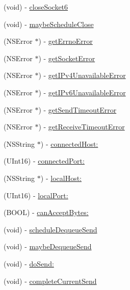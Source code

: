 \begin{DoxyCompactItemize}
(void) -\/ \hyperlink{interface_async_udp_socket_af7dc2926f72fefd01ea33f134adb5fbc}{closeSocket6}
\item 
(void) -\/ \hyperlink{interface_async_udp_socket_a7aa6a27140fde291dfdbc7c384029a8d}{maybeScheduleClose}
\item 
(NSError $\ast$) -\/ \hyperlink{interface_async_udp_socket_a804640cdef7c41b9d00db44feb235149}{getErrnoError}
\item 
(NSError $\ast$) -\/ \hyperlink{interface_async_udp_socket_a9b0a42080e950dde8de512e46e067443}{getSocketError}
\item 
(NSError $\ast$) -\/ \hyperlink{interface_async_udp_socket_a400285c677c62b8a3f30b1185c282514}{getIPv4UnavailableError}
\item 
(NSError $\ast$) -\/ \hyperlink{interface_async_udp_socket_aef7f9ecd9ed1b24c11ec14022d5bf6d6}{getIPv6UnavailableError}
\item 
(NSError $\ast$) -\/ \hyperlink{interface_async_udp_socket_aaef4f2fe9971a5f6a3c4114ada0ca1dd}{getSendTimeoutError}
\item 
(NSError $\ast$) -\/ \hyperlink{interface_async_udp_socket_acb99a994a572be47e40859d6910baee7}{getReceiveTimeoutError}
\item 
(NSString $\ast$) -\/ \hyperlink{interface_async_udp_socket_a7a10cb2cb03eb0e06aea6bcb16f84a8b}{connectedHost:}
\item 
(UInt16) -\/ \hyperlink{interface_async_udp_socket_a5910314780c573d73d483b466020a1ed}{connectedPort:}
\item 
(NSString $\ast$) -\/ \hyperlink{interface_async_udp_socket_a59fe5c5c33e9e7dfa11ffc2bc4e18c38}{localHost:}
\item 
(UInt16) -\/ \hyperlink{interface_async_udp_socket_a384db6eb52b78874c030bcd063046e76}{localPort:}
\item 
(BOOL) -\/ \hyperlink{interface_async_udp_socket_a7bd266b270810085c2cd79205b699fd1}{canAcceptBytes:}
\item 
(void) -\/ \hyperlink{interface_async_udp_socket_ad81347d85c536bf72d1c45110e1a631a}{scheduleDequeueSend}
\item 
(void) -\/ \hyperlink{interface_async_udp_socket_aeaab83c6ba2dac648fc1019ba31f04c3}{maybeDequeueSend}
\item 
(void) -\/ \hyperlink{interface_async_udp_socket_ad6bb348a1a776f1cd547f88f34d1aee8}{doSend:}
\item 
(void) -\/ \hyperlink{interface_async_udp_socket_a7d8663a1ab6fc1f31d2d334d4a114ae6}{completeCurrentSend}
\item 

\end{DoxyCompactItemize}
